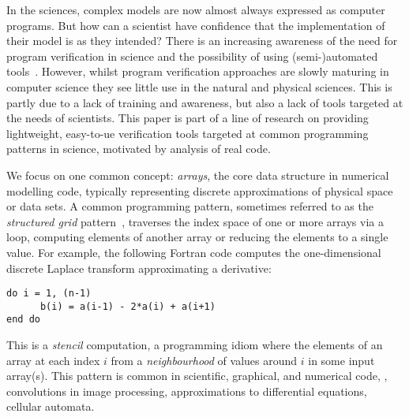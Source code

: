 \noindent
In the sciences, complex models are now almost always expressed as
computer programs. But how can a scientist have confidence that the
implementation of their model is as they intended? There is an
increasing awareness of the need for program verification in science
and the possibility of using (semi-)automated
tools~\cite{post2005computational,oberkampf2010verification,orchard2014computational}.
However, whilst program verification approaches are slowly maturing in
computer science they see little use in the natural and physical
sciences. This is partly due to a lack of training and awareness, but
also a lack of tools targeted at the needs of scientists. This
paper is part of a line of research on providing lightweight, easy-to-ue
verification tools targeted at common programming patterns in science,
motivated by analysis of real code.

We focus on one common concept: \emph{arrays}, the core data structure
in numerical modelling code, typically representing discrete
approximations of physical space or data sets. A common programming
pattern, sometimes referred to as the \emph{structured grid}
pattern~\cite{Asanovic2006}, traverses the index space of one or more
arrays via a loop, computing elements of another array or reducing the
elements to a single value. For example, the following Fortran code
computes the one-dimensional discrete Laplace transform approximating
a derivative:
%
\begin{verbatim}
do i = 1, (n-1)
      b(i) = a(i-1) - 2*a(i) + a(i+1)
end do
\end{verbatim}
%
This is a \emph{stencil} computation, a programming idiom
where the elements of an array at each index $i$ from a
\emph{neighbourhood} of values around $i$ in some input array(s). This
pattern is common in scientific, graphical, and numerical
code, \eg{}, convolutions in image processing, approximations
to differential equations, cellular automata.

